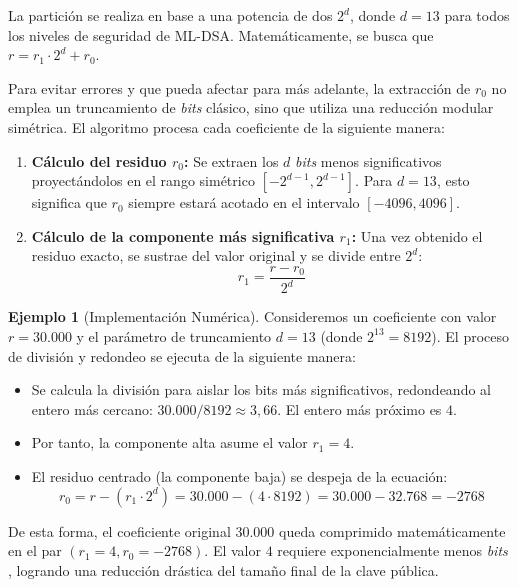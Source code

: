 \documentclass[11pt, a4paper]{report}
\theoremstyle{definition}
\newtheorem{ejemplo}{Ejemplo}[chapter]
\begin{document}
La partición se realiza en base a una potencia de dos $2^d$, donde $d = 13$ para todos los niveles de seguridad de ML-DSA. Matemáticamente, se busca que $r = r_1 \cdot 2^d + r_0$. 

Para evitar errores y que pueda afectar para más adelante, la extracción de $r_0$ no emplea un truncamiento de \textit{bits} clásico, sino que utiliza una reducción modular simétrica. El algoritmo procesa cada coeficiente de la siguiente manera:

\begin{enumerate}
    \item \textbf{Cálculo del residuo $r_0$:} Se extraen los $d$ \textit{bits} menos significativos proyectándolos en el rango simétrico $[-2^{d-1}, 2^{d-1}]$. Para $d=13$, esto significa que $r_0$ siempre estará acotado en el intervalo $[-4096, 4096]$.
    \item \textbf{Cálculo de la componente más significativa $r_1$:} Una vez obtenido el residuo exacto, se sustrae del valor original y se divide entre $2^d$:
    \begin{equation}
        r_1 = \frac{r - r_0}{2^d}
    \end{equation}
\end{enumerate}

\vspace{0.5cm}
\begin{ejemplo}[Implementación Numérica]
\label{ex:compresion_numerica}
Consideremos un coeficiente con valor $r = 30.000$ y el parámetro de truncamiento $d = 13$ (donde $2^{13} = 8192$). El proceso de división y redondeo se ejecuta de la siguiente manera:
\begin{itemize}
    \item Se calcula la división para aislar los bits más significativos, redondeando al entero más cercano: $30.000 / 8192 \approx 3,66$. El entero más próximo es $4$.
    \item Por tanto, la componente alta asume el valor $r_1 = 4$.
    \item El residuo centrado (la componente baja) se despeja de la ecuación: 
    \[ r_0 = r - (r_1 \cdot 2^d) = 30.000 - (4 \cdot 8192) = 30.000 - 32.768 = -2768 \]
\end{itemize}

De esta forma, el coeficiente original $30.000$ queda comprimido matemáticamente en el par $(r_1=4, r_0=-2768)$. El valor $4$ requiere exponencialmente menos \textit{bits} , logrando una reducción drástica del tamaño final de la clave pública.
\end{ejemplo}
\end{document}
